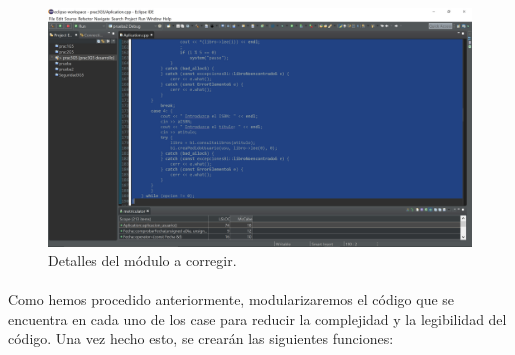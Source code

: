 		\begin{figure}[H]
			\centering
			\includegraphics[scale=0.1]{img/estebanFinal3.png}
			\caption{Detalles del módulo a corregir.}
			\label{estebanFinal3}
		\end{figure}
		
		\paragraph{}Como hemos procedido anteriormente, modularizaremos el código que se encuentra en cada uno de los case para reducir la complejidad y la legibilidad del código. Una vez hecho esto, se crearán las siguientes funciones:
		
